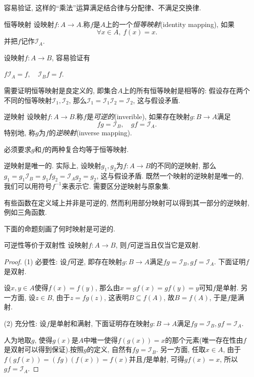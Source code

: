 容易验证, 这样的“乘法”运算满足结合律与分配律、不满足交换律.

\begin{definition}{恒等映射}
	设映射$f: A \to A$.称$f$是$A$上的一个\textit{恒等映射}(identity mapping), 如果$$\forall x\in A, ~f(x)=x.$$
	并把$f$记作$\mathcal{I}_A$.
\end{definition}
\begin{remark}
	设映射$f :  A \to B$, 容易验证有
	\begin{center}
		$f\mathcal{I}_A=f, \quad \mathcal{I}_Bf=f.$
	\end{center}
\end{remark}
\begin{remark}
	需要证明恒等映射是良定义的, 即集合$A$上的所有恒等映射是相等的: 假设存在两个不同的恒等映射$\mathcal{I}_1, \mathcal{I}_2$, 那么$\mathcal{I}_1 = \mathcal{I}_1 \mathcal{I}_2 = \mathcal{I}_2$, 这与假设矛盾.
\end{remark}

\begin{definition}{逆映射}
	设映射$f: A \to B$.称$f$是\textit{可逆的}(inverible), 如果存在映射$g: B \to A$满足$$fg=\mathcal{I}_B, \quad gf=\mathcal{I}_A.$$
	特别地, 称$g$为$f$的\textit{逆映射}(inverse mapping).
\end{definition}
\begin{remark}
	必须要求$g$和$f$的两种复合均等于恒等映射. 
\end{remark}

逆映射是唯一的. 实际上, 设映射$g_1, g_2$为$f: A \to B$的不同的逆映射, 那么$g_1 = g_1\mathcal{I}_B = g_1fg_2 = \mathcal{I}_Ag_2 = g_2$, 这与假设矛盾. 既然一个映射的逆映射是唯一的, 我们可以用符号$f^{-1}$来表示它. 需要区分逆映射与原象集.

有些函数在定义域上并非是可逆的, 然而利用部分映射可以得到其一部分的逆映射, 例如三角函数.

下面的命题刻画了何时映射是可逆的.

\begin{proposition}{可逆性等价于双射性}
	设映射$f: A \to B$, 则$f$可逆当且仅当它是双射.
\end{proposition}
\begin{proof}
	(1) 必要性: 设$f$可逆, 即存在映射$g: B \to A$满足$fg=\mathcal{I}_B, gf=\mathcal{I}_A$. 下面证明$f$是双射. 
	
	设$x, y \in A$使得$f(x)=f(y)$, 那么由$x=gf(x)=gf(y)=y$可知$f$是单射. 另一方面, 设$z \in B$, 由于$z=fg(z)$, 这表明$B \subseteq f(A)$, 故$B = f(A)$, 于是$f$是满射. 
	
	(2) 充分性: 设$f$是单射和满射, 下面证明存在映射$g: B \to A$满足$fg=\mathcal{I}_B, gf=\mathcal{I}_A$. 
	
	人为地取$g$, 使得$g(x)$是$A$中唯一使得$f(g(x))=x$的那个元素(唯一存在性由$f$是双射可以得到保证).按照$g$的定义, 自然有$fg=\mathcal{I}_B$. 另一方面, 任取$x \in A$, 由于$f(gf(x)) = (fg)(f(x)) = f(x)$并且$f$是单射, 可得$gf(x)=x$, 所以$gf=\mathcal{I}_A$.
\end{proof}

